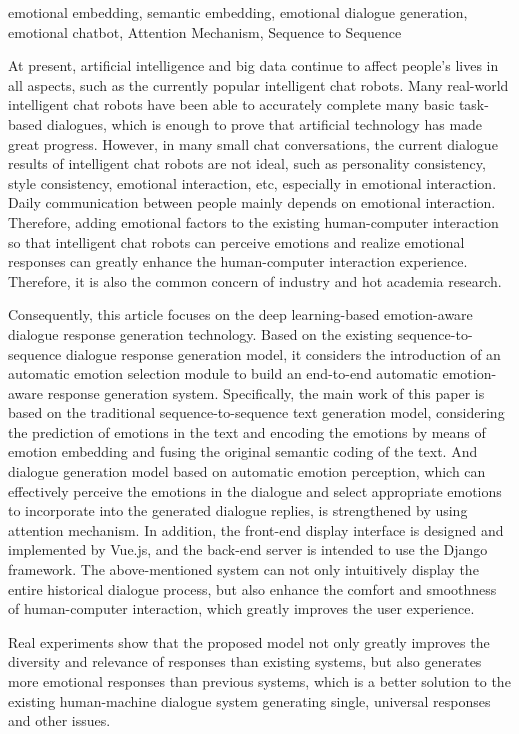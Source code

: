 \documentclass[supercite]{HustGraduPaper}
\theoremstyle{definition}
\begin{document}
\begin{enabstract}{emotional embedding, semantic embedding, emotional dialogue generation, emotional chatbot, Attention Mechanism, Sequence to Sequence}

At present, artificial intelligence and big data continue to affect people's lives in all aspects, such as the currently popular intelligent chat robots. 
Many real-world intelligent chat robots have been able to accurately complete many basic task-based dialogues, 
which is enough to prove that artificial technology has made great progress. 
However, in many small chat conversations, the current dialogue results of intelligent chat robots are not ideal, 
such as personality consistency, style consistency, emotional interaction, etc, especially in emotional interaction. 
Daily communication between people mainly depends on emotional interaction. Therefore, adding emotional factors to the existing 
human-computer interaction so that intelligent chat robots can perceive emotions and realize emotional responses can greatly enhance 
the human-computer interaction experience. Therefore, it is also the common concern of industry and hot academia research.

Consequently, this article focuses on the deep learning-based emotion-aware dialogue response generation technology. Based on the existing 
sequence-to-sequence dialogue response generation model, it considers the introduction of an automatic emotion selection module to build 
an end-to-end automatic emotion-aware response generation system. Specifically, the main work of this paper is based on the traditional 
sequence-to-sequence text generation model, considering the prediction of emotions in the text and encoding the emotions
by means of emotion embedding and fusing the original semantic coding of the text. And dialogue generation model based on automatic emotion 
perception, which can effectively perceive the emotions in the dialogue and select appropriate emotions to incorporate into the generated 
dialogue replies, is strengthened by using attention mechanism. In addition, the front-end display interface 
is designed and implemented by Vue.js, and the back-end server is intended to use the Django framework. The above-mentioned system 
can not only intuitively display the entire historical dialogue process, but also enhance the comfort and smoothness of human-computer 
interaction, which greatly improves the user experience.

Real experiments show that the proposed model not only greatly improves the diversity and relevance of responses than existing systems, 
but also generates more emotional responses than previous systems, which is a better solution to the existing human-machine dialogue system 
generating single, universal responses and other issues.

\end{enabstract}
\end{document}
